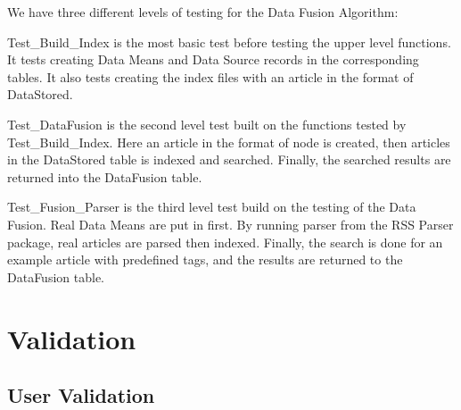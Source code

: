 \documentclass[11pt]{article} %
\begin{document}
We have three different levels of testing for the Data Fusion Algorithm:

Test\_Build\_Index is the most basic test before testing the upper level functions. It tests creating Data Means and Data Source records in the corresponding tables. It also tests creating the index files with an article in the format of DataStored.

Test\_DataFusion is the second level test built on the functions tested by Test\_Build\_Index. Here an article in the format of node is created, then articles in the DataStored table is indexed and searched. Finally, the searched results are returned into the DataFusion table.

Test\_Fusion\_Parser is the third level test build on the testing of the Data Fusion. Real Data Means are put in first. By running parser from the RSS Parser package, real articles are parsed then indexed. Finally, the search is done for an example article with predefined tags, and the results are returned to the DataFusion table. 

\section{Validation}

\subsection{User Validation}
\end{document}
